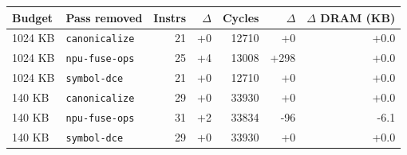 \begin{tabular}{llrrrrr}
\toprule
Budget & Pass removed & Instrs & $\Delta$ & Cycles & $\Delta$ & $\Delta$ DRAM (KB) \\
\midrule
1024 KB & \texttt{canonicalize} & 21 & +0 & 12710 & +0 & +0.0 \\
1024 KB & \texttt{npu-fuse-ops} & 25 & +4 & 13008 & +298 & +0.0 \\
1024 KB & \texttt{symbol-dce} & 21 & +0 & 12710 & +0 & +0.0 \\
140 KB & \texttt{canonicalize} & 29 & +0 & 33930 & +0 & +0.0 \\
140 KB & \texttt{npu-fuse-ops} & 31 & +2 & 33834 & -96 & -6.1 \\
140 KB & \texttt{symbol-dce} & 29 & +0 & 33930 & +0 & +0.0 \\
\bottomrule
\end{tabular}

